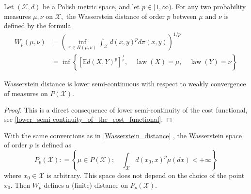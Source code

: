 \begin{defn}
	\label{Wasserstein_distance}
	Let  \(( \mathcal { X } , d ) \) be a Polish metric space, and let \( p \in [ 1 , \infty ) . \) For any two probability measures \( \mu , \nu \) on \( \mathcal { X } , \) the Wasserstein distance of order \( p \) between \( \mu \) and \( \nu \) is defined by the formula
	\begin{align*}
		W _ { p } ( \mu , \nu ) & = \left( \inf _ { \pi \in \Pi ( \mu , \nu ) } \int _ { \mathcal { X } } d ( x , y ) ^ { p } d \pi ( x , y ) \right) ^ { 1 / p }                                                      \\
		                        & = \inf \left\{ \left[ \mathbb { E } d ( X , Y ) ^ { p } \right] ^ { \frac { 1 } { p } } , \quad \operatorname { law } ( X ) = \mu , \quad \operatorname { law } ( Y ) = \nu \right\}
	\end{align*}
\end{defn}

\begin{lem}
	\label{lower_semicontinous_Wasserstein_distance}
	Wasserstein distance is lower semi-continuous with respect to weakly convergence of measures on $P(\mathscr{X})$.
\end{lem}

\begin{proof}
	This is a direct consequence of lower semi-continuity of the cost functional, see \cref{lower_semi-continuity_of_the_cost_functional}.
\end{proof}

\begin{defn}
	\label{Wasserstein_space}
	With the same conventions as in \cref{Wasserstein_distance} , the Wasserstein space of order \( p \) is defined as
	\[
		P _ { p } ( \mathcal { X } ): = \left\{ \mu \in P ( \mathcal { X } ) ; \quad \int _ { \mathcal { X } } d \left( x _ { 0 } , x \right) ^ { p } \mu ( d x ) < + \infty \right\}
	\]
	where \( x _ { 0 } \in \mathcal { X } \) is arbitrary. This space does not depend on the choice of the point \( x _ { 0 } \). Then \( W _ { p } \) defines a (finite) distance on \( P _ { p } ( \mathcal { X } ) \).
\end{defn}

